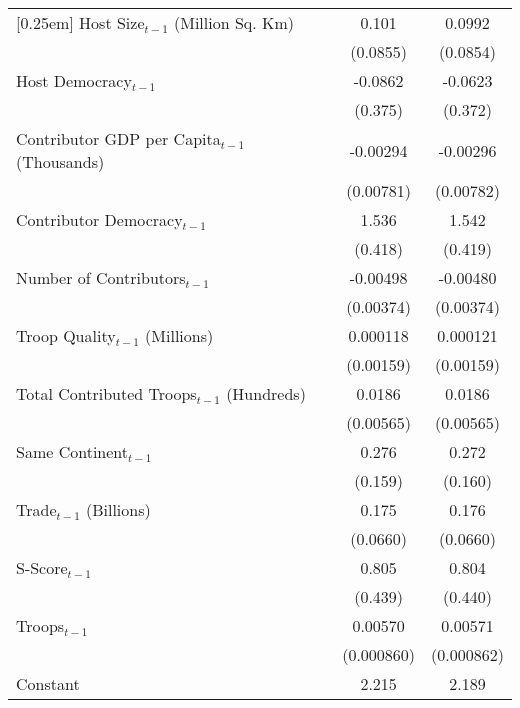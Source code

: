 \begin{table}[htbp]
\begin{tabular}{l*{2}{c}}
[0.25em]
Host Size$_{t-1}$ (Million Sq. Km)&       0.101        &      0.0992        \\
                    &    (0.0855)        &    (0.0854)        \\
[0.25em]
Host Democracy$_{t-1}$      &     -0.0862        &     -0.0623        \\
                    &     (0.375)        &     (0.372)        \\
[0.25em]
Contributor GDP per Capita$_{t-1}$ (Thousands)&    -0.00294        &    -0.00296        \\
                    &   (0.00781)        &   (0.00782)        \\
[0.25em]
Contributor Democracy$_{t-1}$&       1.536\sym{**}&       1.542\sym{**}\\
                    &     (0.418)        &     (0.419)        \\
[0.25em]
Number of Contributors$_{t-1}$&    -0.00498        &    -0.00480        \\
                    &   (0.00374)        &   (0.00374)        \\
[0.25em]
Troop Quality$_{t-1}$ (Millions)&    0.000118        &    0.000121        \\
                    &   (0.00159)        &   (0.00159)        \\
[0.25em]
Total Contributed Troops$_{t-1}$ (Hundreds)&      0.0186\sym{**}&      0.0186\sym{**}\\
                    &   (0.00565)        &   (0.00565)        \\
[0.25em]
Same Continent$_{t-1}$      &       0.276\sym{\dagger} &       0.272\sym{\dagger} \\
                    &     (0.159)        &     (0.160)        \\
[0.25em]
Trade$_{t-1}$ (Billions)    &       0.175\sym{**}&       0.176\sym{**}\\
                    &    (0.0660)        &    (0.0660)        \\
[0.25em]
S-Score$_{t-1}$             &       0.805\sym{\dagger} &       0.804\sym{\dagger} \\
                    &     (0.439)        &     (0.440)        \\
[0.25em]
Troops$_{t-1}$              &     0.00570\sym{**}&     0.00571\sym{**}\\
                    &  (0.000860)        &  (0.000862)        \\
[0.25em]
Constant            &       2.215\sym{**}&       2.189\sym{**}\\

\end{tabular}
\end{table}
